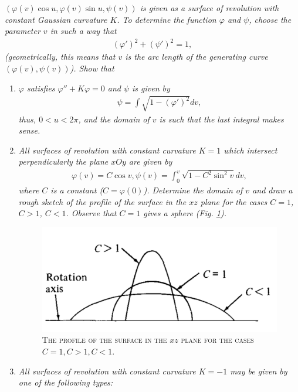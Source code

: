 \documentclass[a4paper]{article}
\numberwithin{equation}{section}
\begin{document}
\textit{$\left( {\varphi \left( v \right)\cos u,\varphi \left( v \right)\sin u,\psi \left( v \right)} \right)$ is given as a surface of revolution with constant Gaussian curvature $K$. To determine the function $\varphi$ and $\psi$, choose the parameter $v$ in such a way that}
\begin{align}
\label{1.104}
{\left( {\varphi '} \right)^2} + {\left( {\psi '} \right)^2} = 1,
\end{align}
\textit{(geometrically, this means that $v$ is the arc length of the generating curve $\left(\varphi \left(v\right), \psi \left(v\right)\right)$). Show that}
\begin{enumerate}
\item \textit{$\varphi$ satisfies $\varphi '' + K\varphi  = 0$ and $\psi$ is given by}
\begin{align}
\psi  = \int {\sqrt {1 - {{\left( {\varphi '} \right)}^2}} } dv,
\end{align}
\textit{thus, $0<u<2\pi$, and the domain of $v$ is such that the last integral makes sense.}
\item \textit{All surfaces of revolution with constant curvature $K=1$ which intersect perpendicularly the plane $xOy$ are given by}
\begin{align}
\varphi \left( v \right) = C\cos v,\psi \left( v \right) = \int_0^v {\sqrt {1 - {C^2}{{\sin }^2}v} dv} ,
\end{align}
\textit{where $C$ is a constant ($C=\varphi \left(0\right)$). Determine the domain of $v$ and draw a rough sketch of the profile of the surface in the $xz$ plane for the cases $C=1$, $C>1$, $C<1$. Observe that $C=1$ gives a sphere (Fig. \ref{3}).}
\begin{figure}[H]
\label{3}
\centering
\includegraphics[scale=0.45]{3}
\caption{\textsc{The profile of the surface in the $xz$ plane for the cases $C=1,C>1,C<1$.}}
\end{figure}
\item \textit{All surfaces of revolution with constant curvature $K=-1$ may be given by one of the following types:}

\end{enumerate}
\end{document}
